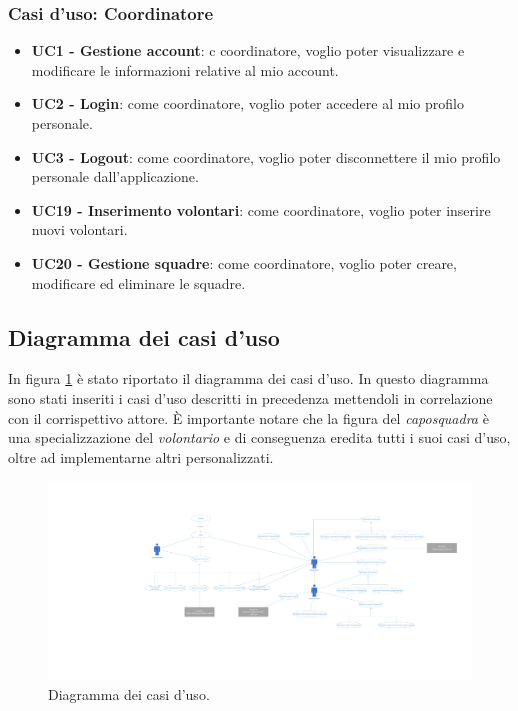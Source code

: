 \subsubsection{Casi d'uso: Coordinatore}
\begin{itemize}
	\item \textbf{UC1 - Gestione account}:
	c coordinatore, voglio poter visualizzare e modificare le informazioni relative al mio account.
	
	\item \textbf{UC2 - Login}:
	come coordinatore, voglio poter accedere al mio profilo personale.
	
	\item \textbf{UC3 - Logout}:
	come coordinatore, voglio poter disconnettere il mio profilo personale dall'applicazione.
	
	\item \textbf{UC19 - Inserimento volontari}:
	come coordinatore, voglio poter inserire nuovi volontari.
	
	\item \textbf{UC20 - Gestione squadre}:
	come coordinatore, voglio poter creare, modificare ed eliminare le squadre.
\end{itemize}


\clearpage
\subsection{Diagramma dei casi d'uso}
In figura \ref{fig:UseCaseDiagram} è stato riportato il diagramma dei casi d'uso. In questo diagramma sono stati inseriti i casi d'uso descritti in precedenza mettendoli in correlazione con il corrispettivo attore. È importante notare che la figura del \textit{caposquadra} è una specializzazione del \textit{volontario} e di conseguenza eredita tutti i suoi casi d'uso, oltre ad implementarne altri personalizzati. 

\begin{figure}
	\centering
	\includegraphics[width=0.9\linewidth]{OtherFiles/Use cases diagram}
	\caption{Diagramma dei casi d'uso.}
	\label{fig:UseCaseDiagram}
\end{figure}



